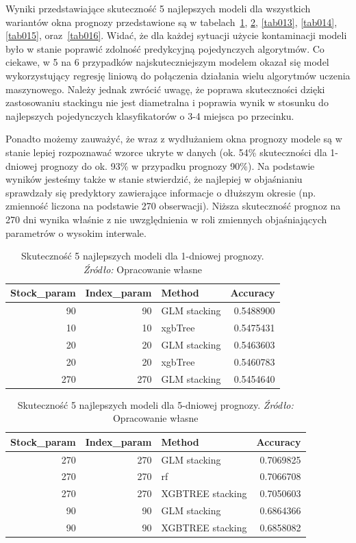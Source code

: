 \documentclass[12pt,a4paper,twoside,openany]{book}
\begin{document}
Wyniki przedstawiające skuteczność 5 najlepszych modeli dla wszystkich wariantów okna prognozy przedstawione są w tabelach~\ref{tab011}, \ref{tab012}, \ref{tab013}, \ref{tab014}, \ref{tab015}, oraz~\ref{tab016}. Widać, że dla każdej sytuacji użycie kontaminacji modeli było w stanie poprawić zdolność predykcyjną pojedynczych algorytmów. Co ciekawe, w 5 na 6 przypadków najskuteczniejszym modelem okazał się model wykorzystujący regresję liniową do połączenia działania wielu algorytmów uczenia maszynowego. Należy jednak zwrócić uwagę, że poprawa skuteczności dzięki zastosowaniu stackingu nie jest diametralna i poprawia wynik w stosunku do najlepszych pojedynczych klasyfikatorów o 3-4 miejsca po przecinku.

Ponadto możemy zauważyć, że wraz z wydłużaniem okna prognozy modele są w stanie lepiej rozpoznawać wzorce ukryte w danych (ok. 54\% skuteczności dla 1-dniowej prognozy do ok. 93\% w przypadku prognozy 90\%). Na podstawie wyników jesteśmy także w stanie stwierdzić, że najlepiej w objaśnianiu sprawdzały się predyktory zawierające informacje o dłuższym okresie (np. zmienność liczona na podstawie 270 obserwacji). Niższa skuteczność prognoz na 270 dni wynika właśnie z nie uwzględnienia w roli zmiennych objaśniających parametrów o wysokim interwale.


\begin{table}[ht]
\caption{Skuteczność 5 najlepszych modeli dla 1-dniowej prognozy. \textit{Źródło:} Opracowanie własne}
\label{tab011}
\centering
\begin{tabular}{rrlr}
  \hline
Stock\_param & Index\_param & Method & Accuracy \\ 
  \hline
      90 &       90 & GLM stacking & 0.5488900 \\ 
        10 &       10 & xgbTree & 0.5475431 \\ 
        20 &       20 & GLM stacking & 0.5463603 \\ 
        20 &       20 & xgbTree & 0.5460783 \\ 
       270 &      270 & GLM stacking & 0.5454640 \\ 
   \hline
\end{tabular}
\end{table}


\begin{table}[ht]
\caption{Skuteczność 5 najlepszych modeli dla 5-dniowej prognozy. \textit{Źródło:} Opracowanie własne}
\label{tab012}
\centering
\begin{tabular}{rrlr}
  \hline
Stock\_param & Index\_param & Method & Accuracy \\ 
  \hline
     270 &      270 & GLM stacking & 0.7069825 \\ 
       270 &      270 & rf & 0.7066708 \\ 
       270 &      270 & XGBTREE stacking & 0.7050603 \\ 
        90 &       90 & GLM stacking & 0.6864366 \\ 
        90 &       90 & XGBTREE stacking & 0.6858082 \\ 
   \hline
\end{tabular}
\end{table}
\end{document}
